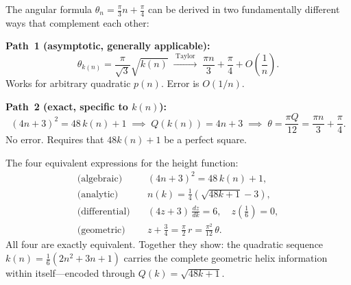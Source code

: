 \begin{tcolorbox}[
  title={Summary: Both Derivation Paths at a Glance},
  colback=blue!3,
  colframe=blue!40!black,
  enhanced,
  breakable
]
The angular formula $\theta_n = \tfrac{\pi}{3}n + \tfrac{\pi}{4}$
can be derived in two fundamentally different ways
that complement each other:

\medskip
\textbf{Path~1 (asymptotic, generally applicable):}
\[
  \theta_{k(n)} = \frac{\pi}{\sqrt{3}}\sqrt{k(n)}
  \;\xrightarrow{\;\text{Taylor}\;}\;
  \frac{\pi n}{3} + \frac{\pi}{4} + O\!\left(\frac{1}{n}\right).
\]
Works for arbitrary quadratic $p(n)$. Error is $O(1/n)$.

\medskip
\textbf{Path~2 (exact, specific to $k(n)$):}
\[
  (4n+3)^2 = 48\,k(n)+1
  \;\implies\;
  Q(k(n)) = 4n+3
  \;\implies\;
  \theta = \frac{\pi Q}{12} = \frac{\pi n}{3} + \frac{\pi}{4}.
\]
No error. Requires that $48k(n)+1$ be a perfect square.

\medskip
The four equivalent expressions for the height function:
\begin{align*}
  \text{(algebraic)} &\quad (4n+3)^2 = 48\,k(n)+1, \\[3pt]
  \text{(analytic)}  &\quad n(k) = \tfrac{1}{4}\!\left(\sqrt{48k+1}-3\right), \\[3pt]
  \text{(differential)} &\quad (4z+3)\,\tfrac{dz}{dk} = 6, \quad
                              z\!\left(\tfrac{1}{6}\right)=0, \\[3pt]
  \text{(geometric)} &\quad z + \tfrac{3}{4} = \tfrac{\pi}{2}\,r
                              = \tfrac{\pi^2}{12}\,\theta.
\end{align*}
All four are exactly equivalent. Together they show: the
quadratic sequence $k(n) = \tfrac{1}{6}(2n^2+3n+1)$ carries the
complete geometric helix information within itself---encoded
through $Q(k) = \sqrt{48k+1}$.
\end{tcolorbox}
